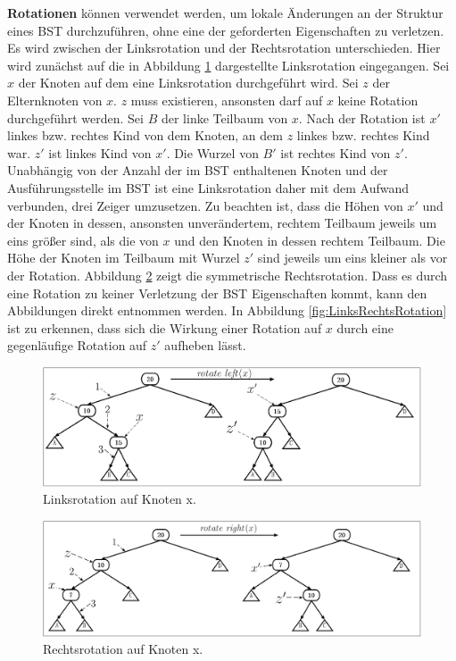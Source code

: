 \documentclass[a4paper,12pt]{article}
\begin{document}
\noindent\textbf{Rotationen} können verwendet werden, um lokale Änderungen an der Struktur eines BST durchzuführen, ohne eine der geforderten Eigenschaften zu verletzen. Es wird zwischen der Linksrotation und der Rechtsrotation 
unterschieden. Hier wird zunächst auf die in Abbildung \ref{fig:Linksrotation} dargestellte Linksrotation eingegangen. 
Sei $x$ der Knoten auf dem eine Linksrotation durchgeführt wird. Sei $z$ der Elternknoten von $x$. $z$ muss existieren, ansonsten darf auf $x$ keine Rotation durchgeführt werden. Sei $B$ der linke Teilbaum von $x$. Nach der Rotation ist $x'$ linkes bzw. rechtes Kind von dem Knoten, an dem $z$ linkes bzw. rechtes Kind war. $z'$ ist linkes Kind von $x'$. Die Wurzel von $B '$ ist rechtes Kind von $z'$. Unabhängig von der Anzahl der im BST enthaltenen Knoten und der Ausführungsstelle im BST ist eine Linksrotation daher mit dem Aufwand verbunden, drei Zeiger umzusetzen. Zu beachten ist, dass die Höhen von $x'$ und der Knoten in dessen, ansonsten unverändertem, rechtem Teilbaum jeweils um eins größer sind, als die von $x$ und den Knoten in dessen rechtem Teilbaum. Die Höhe der Knoten im Teilbaum mit Wurzel $z'$ sind jeweils um eins kleiner als vor der Rotation.
Abbildung \ref{fig:Rechtsrotation} zeigt die symmetrische Rechtsrotation. Dass es durch eine Rotation zu keiner Verletzung der BST Eigenschaften kommt, kann den Abbildungen direkt entnommen werden. In Abbildung \ref{fig:LinksRechtsRotation} ist zu erkennen, dass sich die Wirkung einer Rotation auf $x$ durch eine gegenläufige Rotation auf $z'$ aufheben lässt.  
\begin{figure}[H]
	\centering
	\includegraphics[width= 1\textwidth]{"Medien/Einleitung/Linksrotation"}
	\caption{Linksrotation auf Knoten x. }
	\label{fig:Linksrotation}
\end{figure}
\begin{figure}[H]
	\centering
	\includegraphics[width= 1\textwidth]{"Medien/Einleitung/Rechtsrotation"}
	\caption{Rechtsrotation auf Knoten x. }
	\label{fig:Rechtsrotation}
\end{figure}
\end{document}
